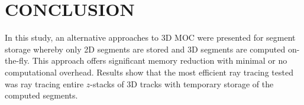 



%
\section{CONCLUSION} 
\label{sect::conclusion}

In this study, an alternative approaches to 3D MOC were presented for segment storage whereby only 2D segments are stored and 3D segments are computed on-the-fly. This approach offers significant memory reduction with minimal or no computational overhead. Results show that the most efficient ray tracing tested was ray tracing entire $z$-stacks of 3D tracks with temporary storage of the computed segments.
\clearpage

